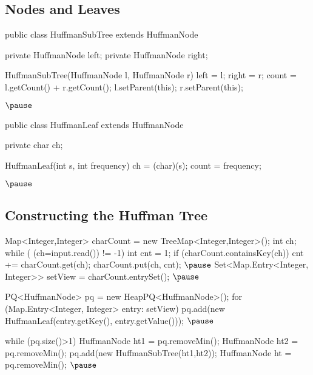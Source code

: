 \begin{slide}
\section[-2]{Nodes and Leaves}

\begin{java}
public class HuffmanSubTree extends HuffmanNode {
    private HuffmanNode left;
    private HuffmanNode right;
    
    HuffmanSubTree(HuffmanNode l, HuffmanNode r)
    {   left = l;
        right = r;
        count = l.getCount() + r.getCount();
        l.setParent(this);
        r.setParent(this);
    }
} $\pause$

public class HuffmanLeaf extends HuffmanNode {
    private char ch;

    HuffmanLeaf(int s, int frequency)
    {   ch = (char)(s);
        count = frequency;
    }
} $\pause$
\end{java}
\end{slide}


\begin{slide}
\section{Constructing the Huffman Tree}

\begin{java}
  Map<Integer,Integer> charCount = new TreeMap<Integer,Integer>();
  int ch;
  while ( (ch=input.read()) != -1) {
      int cnt = 1;
      if (charCount.containsKey(ch))
          cnt += charCount.get(ch);
      charCount.put(ch, cnt);
  } $\pause$
  Set<Map.Entry<Integer, Integer>> setView = charCount.entrySet(); $\pause$

  PQ<HuffmanNode> pq = new HeapPQ<HuffmanNode>();
  for (Map.Entry<Integer, Integer> entry: setView)
      pq.add(new HuffmanLeaf(entry.getKey(), entry.getValue())); $\pause$

  while (pq.size()>1) {
      HuffmanNode ht1 = pq.removeMin();
      HuffmanNode ht2 = pq.removeMin();
      pq.add(new HuffmanSubTree(ht1,ht2));
  }
  HuffmanNode ht = pq.removeMin(); $\pause$
\end{java}
\end{slide}




